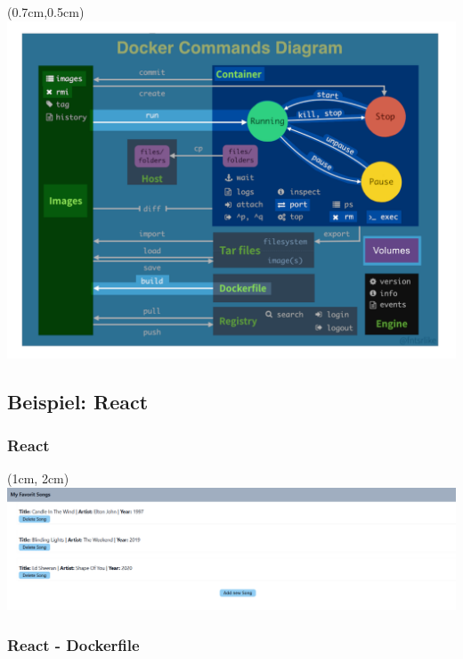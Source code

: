 \documentclass[22pt]{beamer}
\begin{document}
\begin{frame}[t]
    \begin{textblock*}{\paperwidth}(0.7cm,0.5cm) %
        \includegraphics[width=0.9\paperwidth]{Bilder/Commands_Zf.png}
    \end{textblock*}
\end{frame}  

\subsection{Beispiel: React}

    
\begin{frame}[c]
    \frametitle{React}
    \begin{textblock*}{\paperwidth}(1cm, 2cm) %
        \includegraphics[width=0.85\paperwidth]{Bilder/Webseite.png}
    \end{textblock*}
\end{frame}

\begin{frame}[fragile]
    \frametitle{React - Dockerfile}
    \inputminted[fontsize=\footnotesize, frame=lines]{dockerfile}{../examples/React/Dockerfile}
\end{frame}
\end{document}
